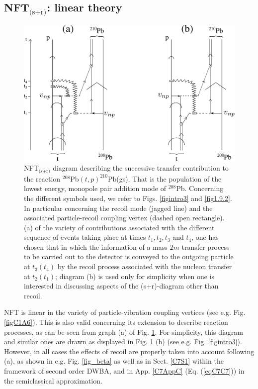 \begin{subappendices}
\section{NFT$_{\text{(s+r)}}$: linear theory}\label{App1C3}
\begin{figure}
\centerline {
\includegraphics*[width=15cm]{introduccion/figs/fig1_C_2}
}
\caption{NFT$_{\text{(s+r)}}$ diagram describing the successive transfer contribution to the reaction $^{208}$Pb$(t,p)^{210}$Pb(gs). That is the population of the lowest energy, monopole pair addition mode of $^{208}$Pb. Concerning the different symbols used, we refer to Figs. \ref{figintro3} and \ref{fig1.9.2}. In particular concerning the recoil mode (jagged line) and the associated particle-recoil  coupling vertex (dashed open rectangle). (a) of the variety of contributions associated with the different sequence of events taking place  at times $t_1,t_2,t_3$ and $t_4$, one has chosen that in which the information of a mass $2m$ transfer process to be carried out to the detector is conveyed to the outgoing particle at $t_3(t_4)$ by the recoil process associated with the nucleon transfer at $t_2(t_1)$; diagram (b) is used only for simplicity when one is interested in discussing aspects of the (s+r)-diagram other than recoil.}
\label{fig1.C.2}
\end{figure}
NFT is linear in the variety of particle-vibration coupling vertices (see e.g. Fig. \ref{figC1A6}).  This is also valid concerning its extension to describe reaction processes, as can be seen from graph (a) of Fig. \ref{fig1.C.2}. For simplicity, this diagram and similar ones are drawn as displayed in Fig. \ref{fig1.C.2} (b) (see e.g. Fig. \ref{figintro3}). However, in all cases the effects of recoil are properly taken into account following (a), as shown in e.g. Fig. \ref{fig_beta} as well as in Sect. \ref{C7S1} within the framework of second order DWBA, and in App. \ref{C7AppC} (Eq. (\ref{eqC7C7})) in the semiclassical approximation.

\end{subappendices}
